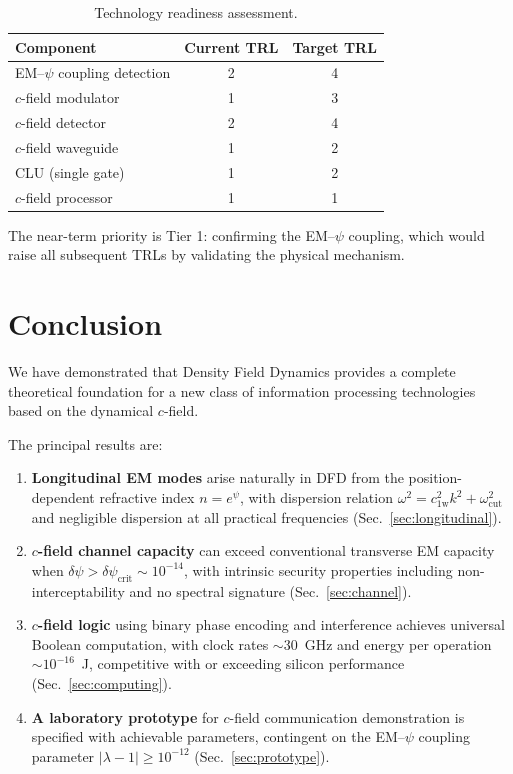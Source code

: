 \documentclass[aps,prd,twocolumn,superscriptaddress,nofootinbib,floatfix]{revtex4-2}
\newcommand{\psifield}{\psi}
\newcommand{\cfield}{c_{\text{1w}}}
\begin{document}
\begin{table}[h]
\caption{Technology readiness assessment.}
\label{tab:TRL}
\begin{ruledtabular}
\begin{tabular}{lcc}
Component & Current TRL & Target TRL \\
\hline
EM--$\psifield$ coupling detection & 2 & 4 \\
$c$-field modulator & 1 & 3 \\
$c$-field detector & 2 & 4 \\
$c$-field waveguide & 1 & 2 \\
CLU (single gate) & 1 & 2 \\
$c$-field processor & 1 & 1 \\
\end{tabular}
\end{ruledtabular}
\end{table}

The near-term priority is Tier 1: confirming the EM--$\psifield$
coupling, which would raise all subsequent TRLs by validating the
physical mechanism.

\section{Conclusion}
\label{sec:conclusion}

We have demonstrated that Density Field Dynamics provides a
complete theoretical foundation for a new class of information
processing technologies based on the dynamical $c$-field.

The principal results are:

\begin{enumerate}
\item \textbf{Longitudinal EM modes} arise naturally in DFD
from the position-dependent refractive index
$n = e^{\psifield}$, with dispersion relation
$\omega^2 = \cfield^2 k^2 + \omega_{\text{cut}}^2$ and
negligible dispersion at all practical frequencies
(Sec.~\ref{sec:longitudinal}).

\item \textbf{$c$-field channel capacity} can exceed conventional
transverse EM capacity when
$\delta\psifield > \delta\psifield_{\text{crit}} \sim 10^{-14}$,
with intrinsic security properties including non-interceptability
and no spectral signature (Sec.~\ref{sec:channel}).

\item \textbf{$c$-field logic} using binary phase encoding and
interference achieves universal Boolean computation, with
clock rates $\sim 30$~GHz and energy per operation
$\sim 10^{-16}$~J, competitive with or exceeding silicon
performance (Sec.~\ref{sec:computing}).

\item \textbf{A laboratory prototype} for $c$-field communication
demonstration is specified with achievable parameters, contingent
on the EM--$\psifield$ coupling parameter
$|\lambda-1| \geq 10^{-12}$ (Sec.~\ref{sec:prototype}).
\end{enumerate}
\end{document}
